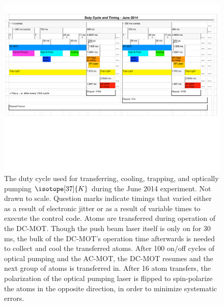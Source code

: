 \begin{figure}[h!!]
	\centering
	\includegraphics[width=.999\linewidth]
	{Figures/DutyCycle_2014.pdf}
	\caption[The 2014 duty cycle for transferring, cooling, trapping, and optically pumping $^{37}\textrm{K}$]{The duty cycle used for transferring, cooling, trapping, and optically pumping $\isotope[37]{K}$ during the June 2014 experiment.  Not drawn to scale.  Question marks indicate timings that varied either as a result of electronic jitter or as a result of variable times to execute the control code.  Atoms are transferred during operation of the DC-MOT.  Though the push beam laser itself is only on for $30\,$ms, the bulk of the DC-MOT's operation time afterwards is needed to collect and cool the transferred atoms.  After 100 on/off cycles of optical pumping and the AC-MOT, the DC-MOT resumes and the next group of atoms is transferred in.  After 16 atom transfers, the polarization of the optical pumping laser is flipped to spin-polarize the atoms in the opposite direction, in order to minimize systematic errors.}	
	\label{fig:dutycycle}
\end{figure}
